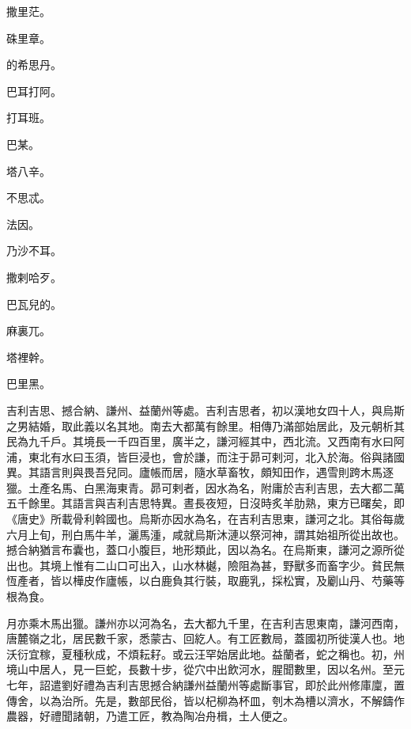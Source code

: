 \begin{pinyinscope}
 撒里茫。



 硃里章。



 的希思丹。



 巴耳打阿。



 打耳班。



 巴某。



 塔八辛。



 不思忒。



 法因。



 乃沙不耳。



 撒剌哈歹。



 巴瓦兒的。



 麻裏兀。



 塔裡幹。



 巴里黑。



 吉利吉思、撼合納、謙州、益蘭州等處。吉利吉思者，初以漢地女四十人，與烏斯之男結婚，取此義以名其地。南去大都萬有餘里。相傳乃滿部始居此，及元朝析其民為九千戶。其境長一千四百里，廣半之，謙河經其中，西北流。又西南有水曰阿浦，東北有水曰玉須，皆巨浸也，會於謙，而注于昴可剌河，北入於海。俗與諸國異。其語言則與畏吾兒同。廬帳而居，隨水草畜牧，頗知田作，遇雪則跨木馬逐獵。土產名馬、白黑海東青。昴可剌者，因水為名，附庸於吉利吉思，去大都二萬五千餘里。其語言與吉利吉思特異。晝長夜短，日沒時炙羊肋熟，東方已曙矣，即《唐史》所載骨利斡國也。烏斯亦因水為名，在吉利吉思東，謙河之北。其俗每歲六月上旬，刑白馬牛羊，灑馬湩，咸就烏斯沐漣以祭河神，謂其始祖所從出故也。撼合納猶言布囊也，蓋口小腹巨，地形類此，因以為名。在烏斯東，謙河之源所從出也。其境上惟有二山口可出入，山水林樾，險阻為甚，野獸多而畜字少。貧民無恆產者，皆以樺皮作廬帳，以白鹿負其行裝，取鹿乳，採松實，及劚山丹、芍藥等根為食。



 月亦乘木馬出獵。謙州亦以河為名，去大都九千里，在吉利吉思東南，謙河西南，唐麓嶺之北，居民數千家，悉蒙古、回紇人。有工匠數局，蓋國初所徙漢人也。地沃衍宜稼，夏種秋成，不煩耘耔。或云汪罕始居此地。益蘭者，蛇之稱也。初，州境山中居人，見一巨蛇，長數十步，從穴中出飲河水，腥聞數里，因以名州。至元七年，詔遣劉好禮為吉利吉思撼合納謙州益蘭州等處斷事官，即於此州修庫廩，置傳舍，以為治所。先是，數部民俗，皆以杞柳為杯皿，刳木為槽以濟水，不解鑄作農器，好禮聞諸朝，乃遣工匠，教為陶冶舟楫，土人便之。




\end{pinyinscope}

